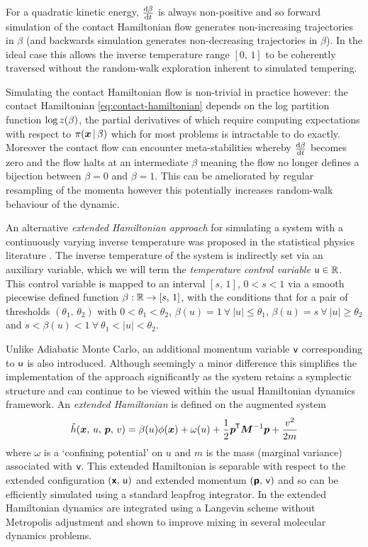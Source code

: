 For a quadratic kinetic energy, $\frac{\mathrm{d} \beta}{\mathrm{d} t}$ is always non-positive and so forward simulation of the contact Hamiltonian flow generates non-increa\-sing trajectories in $\beta$ (and backwards simulation generates non-decreas\-ing trajectories in $\beta$). In the ideal case this allows the inverse temperature range $[0,\,1]$ to be coherently traversed without the random-walk exploration inherent to simulated tempering.

Simulating the contact Hamiltonian flow is non-trivial in practice however: the contact Hamiltonian \eqref{eq:contact-hamiltonian} depends on the log partition function $\log z(\beta)$, the partial derivatives of which require computing expectations with respect to $\pi(\boldsymbol{x}\operatorname{|}\beta)$ which for most problems is intractable to do exactly. Moreover the contact flow can encounter meta-stabilities whereby $\frac{\mathrm{d} \beta}{\mathrm{d} t}$ becomes zero and the flow halts at an intermediate $\beta$ meaning the flow no longer defines a bijection between $\beta=0$ and $\beta=1$. This can be ameliorated by regular resampling of the momenta however this potentially increases random-walk behaviour of the dynamic.

An alternative \emph{extended Hamiltonian approach} for simulating a system with a continuously varying inverse temperature was proposed in the statistical physics literature \citep{gobbo2015extended}. The inverse temperature of the system is indirectly set via an auxiliary variable, which we will term the \emph{temperature control variable} $\mathsf{u} \in \mathbb{R}$. This control variable is mapped to an interval $[s,\,1]$, $0 < s < 1$ via a smooth piecewise defined function $\beta : \mathbb{R} \to [s,\,1]$, with the conditions that for a pair of thresholds $(\theta_1,\,\theta_2)$ with $0 < \theta_1 < \theta_2$, $\beta(u) = 1 ~\forall~ |u| \leq \theta_1$, $\beta(u) = s ~\forall~ |u| \geq \theta_2$ and $s < \beta(u) < 1 ~\forall~ \theta_1 < |u| < \theta_2$.

Unlike Adiabatic Monte Carlo, an additional momentum variable $\mathsf{v}$ corresponding to $\mathsf{u}$ is also introduced. Although seemingly a minor difference this simplifies the implementation of the approach significantly as the system retains a symplectic structure and can continue to be viewed within the usual Hamiltonian dynamics framework. An \emph{extended Hamiltonian} is defined on the augmented system
\begin{equation}\label{eq:extended-hamiltonian-gobbo-leimkuhler}
  \extended{\hamiltonian}(\vct{x},\,u,\,\vct{p},\,v) = 
  \beta(u) \phi(\vct{x}) + \omega(u) + \frac{1}{2} \vct{p}\tr\mtx{M}^{-1}\vct{p} + \frac{v^2}{2m}
\end{equation}
where $\omega$ is a `confining potential' on $u$ and $m$ is the mass (marginal variance) associated with $\mathsf{v}$. This extended Hamiltonian is separable with respect to the extended configuration $(\boldsymbol{\mathsf{x}},\,\mathsf{u})$ and extended momentum $(\boldsymbol{\mathsf{p}},\,\mathsf{v})$ and so can be efficiently simulated using a standard leapfrog integrator. In \cite{gobbo2015extended} the extended Hamiltonian dynamics are integrated using a Langevin scheme without Metropolis adjustment and shown to improve mixing in several molecular dynamics problems. 

